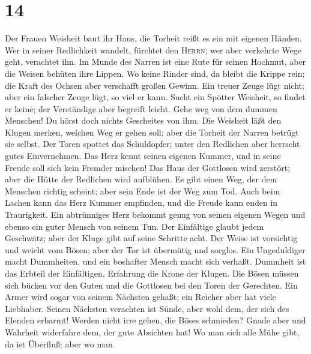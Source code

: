 \hypertarget{section-13}{%
\section{14}\label{section-13}}

 Der Frauen Weisheit baut ihr Haus, die Torheit reißt es
ein mit eigenen Händen.  Wer in seiner Redlichkeit
wandelt, fürchtet den \textsc{Herrn}; wer aber verkehrte Wege geht,
verachtet ihn.  Im Munde des Narren ist eine Rute für
seinen Hochmut, aber die Weisen behüten ihre Lippen.  Wo
keine Rinder sind, da bleibt die Krippe rein; die Kraft des Ochsen aber
verschafft großen Gewinn.  Ein treuer Zeuge lügt nicht;
aber ein falscher Zeuge lügt, so viel er kann.  Sucht ein
Spötter Weisheit, so findet er keine; der Verständige aber begreift
leicht.  Gehe weg von dem dummen Menschen! Du hörst doch
nichts Gescheites von ihm.  Die Weisheit läßt den Klugen
merken, welchen Weg er gehen soll; aber die Torheit der Narren betrügt
sie selbst.  Der Toren spottet das Schuldopfer; unter den
Redlichen aber herrscht gutes Einvernehmen.  Das Herz
kennt seinen eigenen Kummer, und in seine Freude soll sich kein Fremder
mischen!  Das Haus der Gottlosen wird zerstört; aber die
Hütte der Redlichen wird aufblühen.  Es gibt einen Weg,
der dem Menschen richtig scheint; aber sein Ende ist der Weg zum Tod.
 Auch beim Lachen kann das Herz Kummer empfinden, und die
Freude kann enden in Traurigkeit.  Ein abtrünniges Herz
bekommt genug von seinen eigenen Wegen und ebenso ein guter Mensch von
seinem Tun.  Der Einfältige glaubt jedem Geschwätz; aber
der Kluge gibt auf seine Schritte acht.  Der Weise ist
vorsichtig und weicht vom Bösen; aber der Tor ist übermütig und sorglos.
 Ein Ungeduldiger macht Dummheiten, und ein boshafter
Mensch macht sich verhaßt.  Dummheit ist das Erbteil der
Einfältigen, Erfahrung die Krone der Klugen.  Die Bösen
müssen sich bücken vor den Guten und die Gottlosen bei den Toren der
Gerechten.  Ein Armer wird sogar von seinem Nächsten
gehaßt; ein Reicher aber hat viele Liebhaber.  Seinen
Nächsten verachten ist Sünde, aber wohl dem, der sich des Elenden
erbarmt!  Werden nicht irre gehen, die Böses schmieden?
Gnade aber und Wahrheit widerfahre dem, der gute Absichten hat!
 Wo man sich alle Mühe gibt, da ist Überfluß; aber wo man
